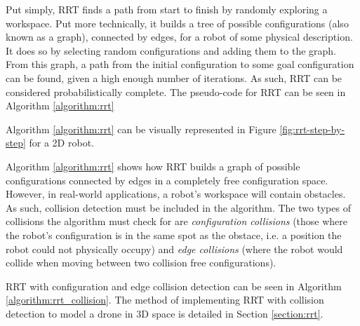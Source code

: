         Put simply, \gls{RRT} finds a path from start to finish by randomly exploring a workspace.
        Put more technically, it builds a tree of possible \glspl{configuration} (also known as a graph), connected by edges, for a robot of some physical description. It does so by selecting random \glspl{configuration} and adding them to the graph. 
        From this graph, a path from the initial \gls{configuration} to some goal \gls{configuration} can be found, given a high enough number of iterations. As such, \gls{RRT} can be considered \gls{probabilistically complete}.
        The pseudo-code for \gls{RRT} can be seen in Algorithm \ref{algorithm:rrt}
        
        

        Algorithm \ref{algorithm:rrt} can be visually represented in Figure \ref{fig:rrt-step-by-step} for a 2D robot.

        

        \newpage

        Algorithm \ref{algorithm:rrt} shows how \gls{RRT} builds a graph of possible \gls{configuration}s connected by edges in a completely free \gls{configuration} space. However, in real-world applications, a robot's \gls{workspace} will contain obstacles. As such, collision detection must be included in the algorithm. The two types of collisions the algorithm must check for are \textit{configuration collisions} (those where the robot's configuration is in the same spot as the obstace, i.e. a position the robot could not physically occupy) and \textit{edge collisions} (where the robot would collide when moving between two collision free \glspl{configuration}).

        \gls{RRT} with \gls{configuration} and edge collision detection can be seen in Algorithm \ref{algorithm:rrt_collision}. The method of implementing \gls{RRT} with collision detection to model a drone in 3D space is detailed in Section \ref{section:rrt}.

        
